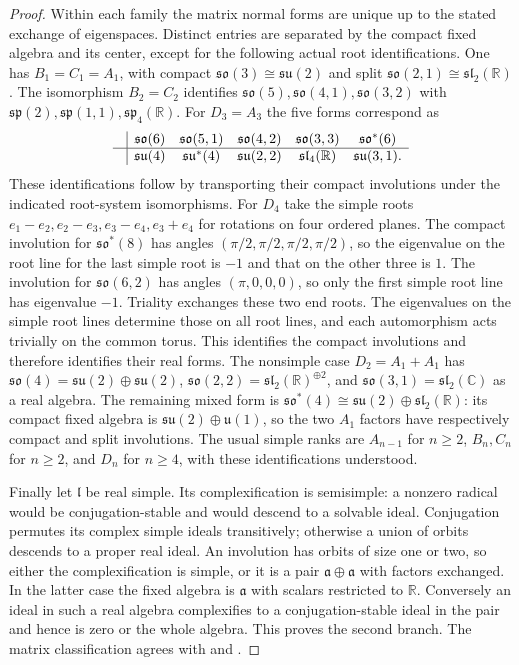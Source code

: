 \begin{proof}
Within each family the matrix normal forms are unique up
to the stated exchange of eigenspaces. Distinct entries
are separated by the compact fixed algebra and its
center, except for the following actual root identifications.
One has \(B_1=C_1=A_1\), with compact
\(\mathfrak{so}(3)\cong\mathfrak{su}(2)\) and split
\(\mathfrak{so}(2,1)\cong\mathfrak{sl}_2(\mathbb R)\).
The isomorphism \(B_2=C_2\) identifies
\(\mathfrak{so}(5),\mathfrak{so}(4,1),\mathfrak{so}(3,2)\)
with \(\mathfrak{sp}(2),\mathfrak{sp}(1,1),
\mathfrak{sp}_4(\mathbb R)\).
For \(D_3=A_3\) the five forms correspond as
\[
\begin{array}{c|ccccc}
 &\mathfrak{so}(6)&\mathfrak{so}(5,1)&\mathfrak{so}(4,2)&
       \mathfrak{so}(3,3)&\mathfrak{so}^*(6)\\ \hline
 &\mathfrak{su}(4)&\mathfrak{su}^*(4)&\mathfrak{su}(2,2)&
       \mathfrak{sl}_4(\mathbb R)&\mathfrak{su}(3,1).
\end{array}
\]
These identifications follow by transporting their compact
involutions under the indicated root-system isomorphisms.
For \(D_4\) take the simple roots \(e_1-e_2,e_2-e_3,
e_3-e_4,e_3+e_4\) for rotations on four ordered planes.
The compact involution for \(\mathfrak{so}^*(8)\) has
angles \((\pi/2,\pi/2,\pi/2,\pi/2)\), so the eigenvalue
on the root line for the last simple root is \(-1\)
and that on the other three is \(1\). The involution for
\(\mathfrak{so}(6,2)\) has angles \((\pi,0,0,0)\), so
only the first simple root line has eigenvalue \(-1\).
Triality exchanges these two end roots. The eigenvalues
on the simple root lines determine those on all root
lines, and each automorphism acts trivially on the
common torus. This identifies the compact involutions
and therefore identifies their real forms.
The nonsimple case \(D_2=A_1+A_1\) has
\(\mathfrak{so}(4)=\mathfrak{su}(2)\oplus\mathfrak{su}(2)\),
\(\mathfrak{so}(2,2)=\mathfrak{sl}_2(\mathbb R)^{\oplus2}\),
and \(\mathfrak{so}(3,1)=\mathfrak{sl}_2(\mathbb C)\)
as a real algebra. The remaining mixed form is
\(\mathfrak{so}^*(4)\cong
\mathfrak{su}(2)\oplus\mathfrak{sl}_2(\mathbb R)\):
its compact fixed algebra is
\(\mathfrak{su}(2)\oplus\mathfrak u(1)\), so the two
\(A_1\) factors have respectively compact and split involutions.
The usual simple ranks are
\(A_{n-1}\) for \(n\geq2\), \(B_n,C_n\) for \(n\geq2\),
and \(D_n\) for \(n\geq4\), with these identifications understood.

Finally let \(\mathfrak l\) be real simple. Its complexification
is semisimple: a nonzero radical would be conjugation-stable
and would descend to a solvable ideal. Conjugation permutes
its complex simple ideals transitively; otherwise a union
of orbits descends to a proper real ideal. An involution
has orbits of size one or two, so either the complexification
is simple, or it is a pair \(\mathfrak a\oplus\mathfrak a\)
with factors exchanged. In the latter case the fixed algebra
is \(\mathfrak a\) with scalars restricted to \(\mathbb R\).
Conversely an ideal in such a real algebra complexifies
to a conjugation-stable ideal in the pair and hence is
zero or the whole algebra. This proves the second branch.
The matrix classification agrees with
\cite[Section 41.4]{etingof} and
\cite[Theorem 6.105]{knapp}.
\end{proof}

